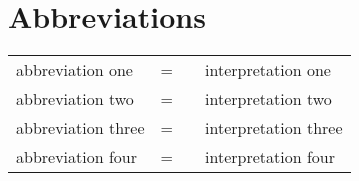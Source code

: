 \chapter*{Abbreviations}

\noindent
\begin{tabular}{ l p{3mm} p{1mm} l }
abbreviation one        & = & &     interpretation one      \\
abbreviation two        & = & &     interpretation two      \\
abbreviation three      & = & &     interpretation three    \\
abbreviation four       & = & &     interpretation four     \\
\end{tabular}


%
%
%
%

%
%

%
%


